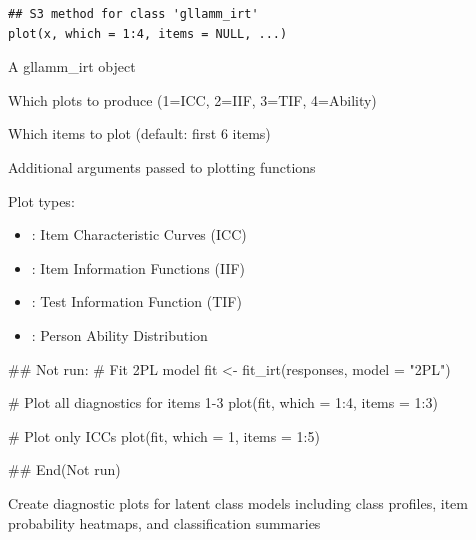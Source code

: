 \documentclass[a4paper]{book}
\begin{document}
%
\begin{Usage}
\begin{verbatim}
## S3 method for class 'gllamm_irt'
plot(x, which = 1:4, items = NULL, ...)
\end{verbatim}
\end{Usage}
%
\begin{Arguments}
\begin{ldescription}
\item[\code{x}] A gllamm\_irt object

\item[\code{which}] Which plots to produce (1=ICC, 2=IIF, 3=TIF, 4=Ability)

\item[\code{items}] Which items to plot (default: first 6 items)

\item[\code{...}] Additional arguments passed to plotting functions
\end{ldescription}
\end{Arguments}
%
\begin{Details}
Plot types:
\begin{itemize}

\item{} : Item Characteristic Curves (ICC)
\item{} : Item Information Functions (IIF)
\item{} : Test Information Function (TIF)
\item{} : Person Ability Distribution

\end{itemize}

\end{Details}
%
\begin{Examples}
\begin{ExampleCode}
## Not run: 
# Fit 2PL model
fit <- fit_irt(responses, model = "2PL")

# Plot all diagnostics for items 1-3
plot(fit, which = 1:4, items = 1:3)

# Plot only ICCs
plot(fit, which = 1, items = 1:5)

## End(Not run)

\end{ExampleCode}
\end{Examples}
%
\begin{Description}
Create diagnostic plots for latent class models including class profiles,
item probability heatmaps, and classification summaries
\end{Description}
\end{document}
